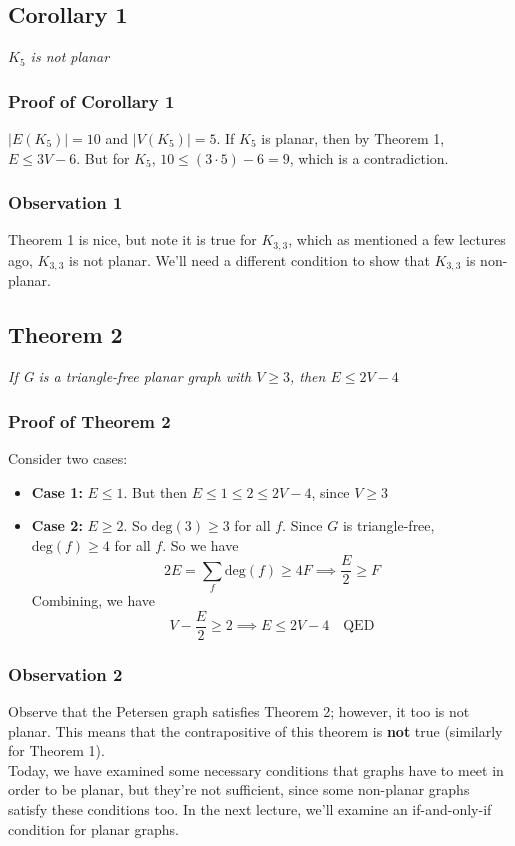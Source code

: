 \documentclass{report}
\begin{document}
\subsection{Corollary 1}
\begin{center}
\textit{$K_5$ is not planar}
\end{center}
\subsubsection{Proof of Corollary 1}
$\vert E(K_5) \vert = 10$ and $\vert V(K_5) \vert = 5$. If $K_5$ is planar, then by Theorem 1, $E \leq 3V - 6$. But for $K_5$, $10 \leq (3\cdot 5) - 6 = 9$, which is a contradiction.
\subsubsection{Observation 1}
Theorem 1 is nice, but note it is true for $K_{3,3}$, which as mentioned a few lectures ago, $K_{3,3}$ is not planar. We'll need a different condition to show that $K_{3,3}$ is non-planar.
\subsection{Theorem 2}
\begin{center}
\textit{If G is a triangle-free planar graph with $V \geq 3$, then $E \leq 2V - 4$}
\end{center}
\subsubsection{Proof of Theorem 2}
Consider two cases:
\begin{itemize}
\item \textbf{Case 1:} $E \leq 1$. But then $E \leq 1 \leq 2 \leq 2V - 4$, since $V \geq 3$
\item \textbf{Case 2:} $E \geq 2$. So $\mathrm{deg}(3) \geq 3$ for all $f$. Since $G$ is triangle-free, $\mathrm{deg}(f) \geq 4$ for all $f$. So we have $$2E = \sum_f \mathrm{deg}(f) \geq 4F \implies \frac{E}{2} \geq F$$
Combining, we have
$$V - \frac{E}{2} \geq 2 \implies E \leq 2V - 4 \quad \text{QED}$$
\end{itemize}
\subsubsection{Observation 2}
Observe that the Petersen graph satisfies Theorem 2; however, it too is not planar. This means that the contrapositive of this theorem is \textbf{not} true (similarly for Theorem 1).\\
Today, we have examined some necessary conditions that graphs have to meet in order to be planar, but they're not sufficient, since some non-planar graphs satisfy these conditions too. In the next lecture, we'll examine an if-and-only-if condition for planar graphs.
\newpage
\end{document}

